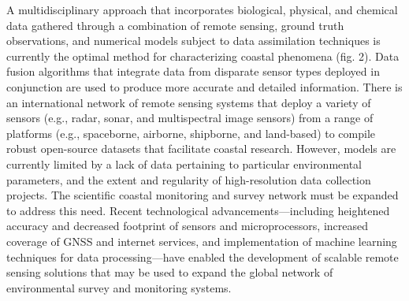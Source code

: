 \documentclass{article}
\begin{document}
\par{A multidisciplinary approach that incorporates biological, physical, and chemical data gathered through a combination of remote sensing, ground truth observations, and numerical models subject to data assimilation techniques is currently the optimal method for characterizing coastal phenomena (fig. 2). Data fusion algorithms that integrate data from disparate sensor types deployed in conjunction are used to produce more accurate and detailed information. There is an international network of remote sensing systems that deploy a variety of sensors (e.g., radar, sonar, and multispectral image sensors) from a range of platforms (e.g., spaceborne, airborne, shipborne, and land-based) to compile robust open-source datasets that facilitate coastal research. However, models are currently limited by a lack of data pertaining to particular environmental parameters, and the extent and regularity of high-resolution data collection projects. The scientific coastal monitoring and survey network must be expanded to address this need. Recent technological advancements—including heightened accuracy and decreased footprint of sensors and microprocessors, increased coverage of GNSS and internet services, and implementation of machine learning techniques for data processing—have enabled the development of scalable remote sensing solutions that may be used to expand the global network of environmental survey and monitoring systems.}

\end{document}
